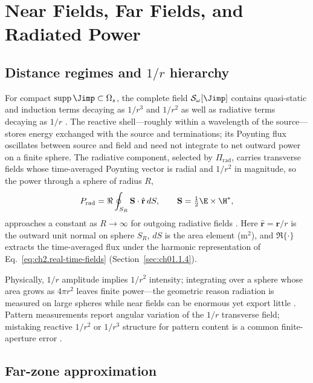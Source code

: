 
\section{Near Fields, Far Fields, and Radiated Power}
\label{sec:ch02.5}

\subsection[Distance regimes and \texorpdfstring{$1/r$}{1/r} hierarchy]{Distance regimes and $1/r$ hierarchy}
\label{sec:ch02.5.1}

For compact $\operatorname{supp}\Jimp\subset\Omega_s$, the complete field $\mathcal{S}_\omega[\Jimp]$ contains quasi-static and induction terms decaying as $1/r^3$ and $1/r^2$ as well as radiative terms decaying as $1/r$ \cite{stratton1941,jackson1999}. The reactive shell---roughly within a wavelength of the source---stores energy exchanged with the source and terminations; its Poynting flux oscillates between source and field and need not integrate to net outward power on a finite sphere. The radiative component, selected by $\Pi_{\mathrm{rad}}$, carries transverse fields whose time-averaged Poynting vector is radial and $1/r^2$ in magnitude, so the power through a sphere of radius $R$,
\begin{equation}
\label{eq:ch2.radiated-power}
P_{\mathrm{rad}}=\Re\oint_{S_R}\mathbf{S}\cdot\hat{\mathbf{r}}\,dS,
\qquad
\mathbf{S}=\tfrac12\E\times\H^*,
\end{equation}
approaches a constant as $R\to\infty$ for outgoing radiative fields \cite{poynting1884}. Here $\hat{\mathbf{r}}=\mathbf{r}/r$ is the outward unit normal on sphere $S_R$, $dS$ is the area element (m$^2$), and $\Re\{\cdot\}$ extracts the time-averaged flux under the harmonic representation of Eq.~\eqref{eq:ch2.real-time-fields} (Section~\ref{sec:ch01.1.4}).

Physically, $1/r$ amplitude implies $1/r^2$ intensity; integrating over a sphere whose area grows as $4\pi r^2$ leaves finite power---the geometric reason radiation is measured on large spheres while near fields can be enormous yet export little \cite{stratton1941}. Pattern measurements report angular variation of the $1/r$ transverse field; mistaking reactive $1/r^2$ or $1/r^3$ structure for pattern content is a common finite-aperture error \cite{hansen1988}.

\subsection{Far-zone approximation}
\label{sec:ch02.5.2}

